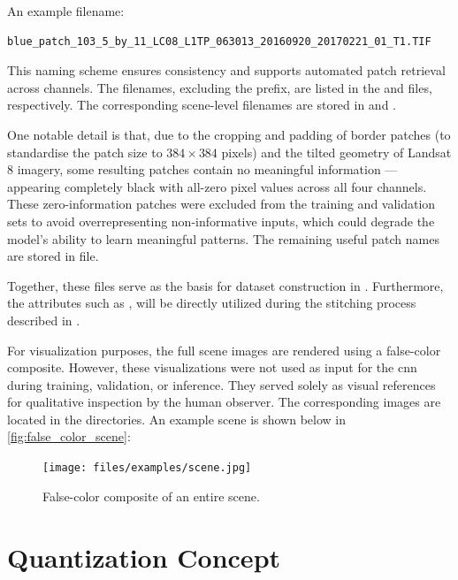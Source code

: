 {An example filename:

\begin{lstlisting}
blue_patch_103_5_by_11_LC08_L1TP_063013_20160920_20170221_01_T1.TIF
\end{lstlisting}

This naming scheme ensures consistency and supports automated patch retrieval across channels.
The filenames, excluding the  prefix, are listed in the  and  files, respectively.
The corresponding scene-level filenames are stored in  and .

One notable detail is that, due to the cropping and padding of border patches (to standardise the patch size to \ensuremath{384\times384} pixels) and the tilted geometry of Landsat 8 imagery,
some resulting patches contain no meaningful information --- appearing completely black with all-zero pixel values across all four channels.
These zero-information patches were excluded from the training and validation sets to avoid overrepresenting non-informative inputs,
which could degrade the model's ability to learn meaningful patterns.
The remaining useful patch names are stored in  file.

Together, these  files serve as the basis for dataset construction in .
Furthermore, the attributes such as ,  will be directly utilized during the stitching process described in .

For visualization purposes, the full scene images are rendered using a false-color composite.
However, these visualizations were not used as input for the \gls{cnn} during training, validation, or inference.
They served solely as visual references for qualitative inspection by the human observer.
The corresponding images are located in the  directories.
An example scene is shown below in \autoref{fig:false_color_scene}: 

\begin{figure}[H]
  \centering
  \texttt{[image: files/examples/scene.jpg]}
  \caption{False-color composite of an entire scene.}
  \label{fig:false_color_scene}
\end{figure}


\section{Quantization Concept}
\label{subsec:quantization}

}

